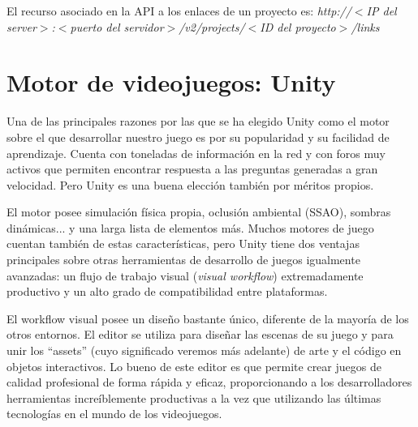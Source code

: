 El recurso asociado en la API a los enlaces de un proyecto es: \textit{http://$<$IP del server$>$:$<$puerto del servidor$>$/v2/projects/$<$ID del proyecto$>$/links}
 
\section{Motor de videojuegos: Unity}
Una de las principales razones por las que se ha elegido Unity como el motor sobre el que desarrollar nuestro juego es por su popularidad y su facilidad de aprendizaje. Cuenta con toneladas de información en la red y con foros muy activos que permiten encontrar respuesta a las preguntas generadas a gran velocidad. Pero Unity es una buena elección también por méritos propios.

El motor posee simulación física propia, oclusión ambiental (SSAO), sombras dinámicas... y una larga lista de elementos más. Muchos motores de juego cuentan también de estas características, pero Unity tiene dos ventajas principales sobre otras herramientas de desarrollo de juegos igualmente avanzadas: un flujo de trabajo visual (\textit{visual workflow}) extremadamente productivo y un alto grado de compatibilidad entre plataformas.

El workflow visual posee un diseño bastante único, diferente de la mayoría de los otros entornos. El editor se utiliza para diseñar las escenas de su juego y para unir los ``assets'' (cuyo significado veremos más adelante) de arte y el código en objetos interactivos. Lo bueno de este editor es que permite crear juegos de calidad profesional de forma rápida y eficaz, proporcionando a los desarrolladores herramientas increíblemente productivas a la vez que utilizando las últimas tecnologías en el mundo de los videojuegos.